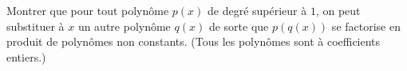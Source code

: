 Montrer que pour tout polynôme $p(x)$ de degré supérieur à $1$, on peut substituer à $x$ un autre polynôme $q(x)$ de sorte que $p(q(x))$ se factorise en produit de polynômes non constants. (Tous les polynômes sont à coefficients entiers.)
